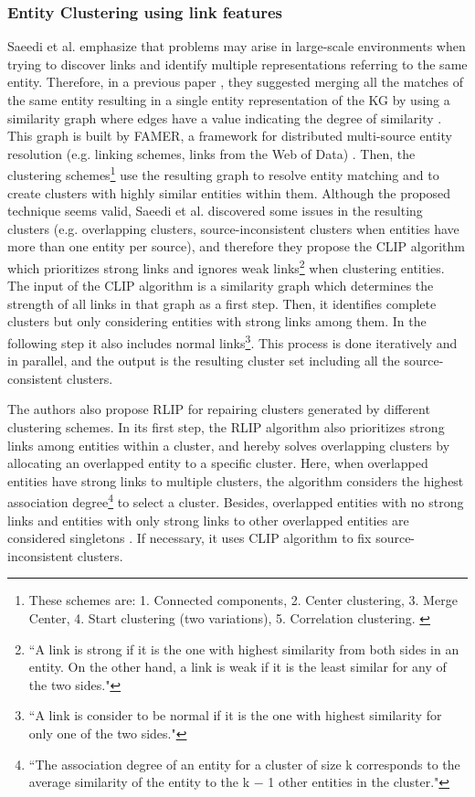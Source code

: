 \documentclass[runningheads]{llncs}
\begin{document}
\subsubsection{Entity Clustering using link features} \label{entity-clustering} 
Saeedi et al. \cite{Saeedi} emphasize that problems may arise in large-scale environments when trying to discover links and identify multiple representations referring to the same entity. Therefore, in a previous paper \cite{Peukert}, they suggested merging all the matches of the same entity resulting in a single entity representation of the KG by using a similarity graph where edges have a value indicating the degree of similarity \cite{Saeedi}. This graph is built by FAMER, a framework for distributed multi-source entity resolution (e.g. linking schemes, links from the Web of Data) \cite{Peukert}. Then, the clustering schemes\footnote{These schemes are: 1. Connected components, 2. Center clustering, 3. Merge Center, 4. Start clustering (two variations), 5. Correlation clustering. \cite{Peukert}} use the resulting graph to resolve entity matching and to create clusters with highly similar entities within them. Although the proposed technique seems valid, Saeedi et al. discovered some issues in the resulting clusters (e.g. overlapping clusters, source-inconsistent clusters when entities have more than one entity per source), and therefore they propose the CLIP algorithm which prioritizes strong links and ignores weak links\footnote{``A link is strong if it is the one with highest similarity from both sides in an entity. On the other hand, a link is weak if it is the least similar for any of the two sides."\cite{Saeedi}} when clustering entities. The input of the CLIP algorithm is a similarity graph which determines the strength of all links in that graph as a first step. Then, it identifies complete clusters but only considering entities with strong links among them. In the following step it also includes normal links\footnote{``A link is consider to be normal if it is the one with highest similarity for only one of the two sides."\cite{Saeedi}}. This process is done iteratively and in parallel, and the output is the resulting cluster set including all the source-consistent clusters. 

The authors also propose RLIP for repairing clusters generated by different clustering schemes. In its first step, the RLIP algorithm also prioritizes strong links among entities within a cluster, and hereby solves overlapping clusters by allocating an overlapped entity to a specific cluster. Here, when overlapped entities have strong links to multiple clusters, the algorithm considers the highest association degree\footnote{``The association degree of an entity for a cluster of size k corresponds to the average similarity of the entity to the k − 1 other entities in the cluster."\cite{Saeedi}} to select a cluster. Besides, overlapped entities with no strong links and entities with only strong links to other overlapped entities are considered singletons \cite{Saeedi}. If necessary, it uses CLIP algorithm to fix source-inconsistent clusters.
\end{document}
